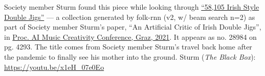 \documentclass[a4paper,notitlepage,twoside]{book}
\begin{document}
\clearpage
{}
{}  
\hypertarget{piece:HeadingHome}{}
Society member Sturm found this piece 
while looking through 
\href{http://urn.kb.se/resolve?urn=urn:nbn:se:kth:diva-296578}{``58,105 Irish Style Double Jigs''} ---
a collection generated by folk-rnn (v2, w/ beam search n=2)
as part of Society member Sturm's paper,
``An Artificial Critic of Irish Double Jigs'', in \href{https://aimc2021.iem.at/program/papers/}{Proc. AI Music Creativity Conference, Graz, 2021}.
It appears as no. 28984 on pg. 4293.
The title comes from Society member Sturm's
travel back home after the pandemic to finally
see his mother into the ground.
Sturm ({\em The Black Box}): \url{https://youtu.be/x1eH_07e0Eo}




%
%


\clearpage
\printindex

\backmatter 

\end{document}
